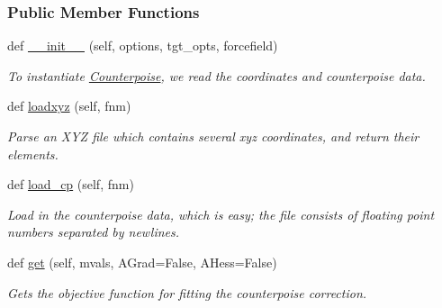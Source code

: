 \subsubsection*{Public Member Functions}
\begin{DoxyCompactItemize}
\item 
def \hyperlink{classsrc_1_1counterpoise_1_1Counterpoise_ae6afcfe82039112c68507ef5e5e32f83}{\+\_\+\+\_\+init\+\_\+\+\_\+} (self, options, tgt\+\_\+opts, forcefield)
\begin{DoxyCompactList}\small\item\em To instantiate \hyperlink{classsrc_1_1counterpoise_1_1Counterpoise}{Counterpoise}, we read the coordinates and counterpoise data. \end{DoxyCompactList}\item 
def \hyperlink{classsrc_1_1counterpoise_1_1Counterpoise_abe282b072c0d1c5b5a3e2438ffc911c4}{loadxyz} (self, fnm)
\begin{DoxyCompactList}\small\item\em Parse an X\+YZ file which contains several xyz coordinates, and return their elements. \end{DoxyCompactList}\item 
def \hyperlink{classsrc_1_1counterpoise_1_1Counterpoise_adcac3179e13b18b0e46921fadf6a85c0}{load\+\_\+cp} (self, fnm)
\begin{DoxyCompactList}\small\item\em Load in the counterpoise data, which is easy; the file consists of floating point numbers separated by newlines. \end{DoxyCompactList}\item 
def \hyperlink{classsrc_1_1counterpoise_1_1Counterpoise_a87c8e02ded9adab8ecf74d64befdd5e6}{get} (self, mvals, A\+Grad=False, A\+Hess=False)
\begin{DoxyCompactList}\small\item\em Gets the objective function for fitting the counterpoise correction. \end{DoxyCompactList}\end{DoxyCompactItemize}
